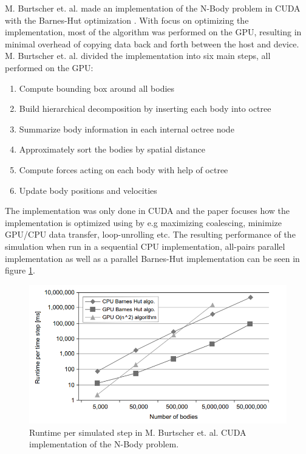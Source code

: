 M. Burtscher et. al. made an implementation of the N-Body problem in CUDA with the Barnes-Hut optimization \cite{burtscher2011efficient}. With focus on optimizing the implementation, most of the algorithm was performed on the GPU, resulting in minimal overhead of copying data back and forth between the host and device. M. Burtscher et. al. divided the implementation into six main steps, all performed on the GPU:
\begin{enumerate}
    \item Compute bounding box around all bodies
    \item Build hierarchical decomposition by inserting each body into octree
    \item Summarize body information in each internal octree node
    \item Approximately sort the bodies by spatial distance
    \item Compute forces acting on each body with help of octree
    \item Update body positions and velocities
\end{enumerate}

\noindent The implementation was only done in CUDA and the paper focuses how the implementation is optimized using by e.g maximizing coalescing, minimize GPU/CPU data transfer, loop-unrolling etc. The resulting performance of the simulation when run in a sequential CPU implementation, all-pairs parallel implementation as well as a parallel Barnes-Hut implementation can be seen in figure \ref{fig:BurtscherResults}.

\begin{figure}[!htpb]
    \centering
    \includegraphics[width=\textwidth]{Introduction/Figs/CPUvsGPUn2vsBarnesHut.png}
    \caption{Runtime per simulated step in M. Burtscher et. al. CUDA implementation of the N-Body problem. \cite{burtscher2011efficient}}
    \label{fig:BurtscherResults}
\end{figure}

